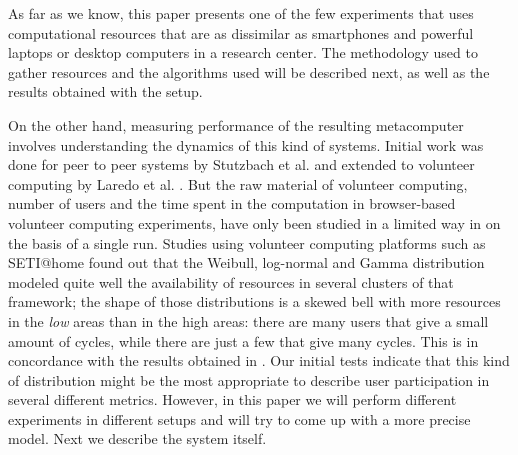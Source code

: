\documentclass[journal,onecolumn]{IEEEtran}
\begin{document}
As far as we know, this paper presents one of the few experiments that
uses computational 
resources that are as dissimilar as smartphones and powerful laptops
or desktop computers in a research center. The methodology used to
gather resources and the algorithms used will be described next, as
well as the results obtained with the setup.




On the other hand, measuring performance of the resulting metacomputer
involves understanding the dynamics of this kind of systems. Initial
work was done for peer to peer systems by Stutzbach et
al. \cite{stutzbach2006understanding} and extended to volunteer
computing by Laredo et al. \cite{churn08,laredo2008rcp}. But the raw material of
volunteer computing, number of users and the time spent in the
computation in browser-based volunteer computing experiments, have only been studied in a limited way in
\cite{DBLP:journals/gpem/LaredoBGVAGF14} on the basis of a single
run. Studies using volunteer computing platforms such as SETI@home
\cite{javadi2009mining} found out that the Weibull, log-normal and Gamma distribution
modeled quite well the availability of resources in several clusters
of that framework; the shape of those distributions is a skewed bell
with more resources in the {\em low} areas than in the high areas:
there are many users that give a small amount of cycles, while there
are just a few that give many cycles. This is in concordance with the
results obtained in \cite{agajaj}. Our initial tests indicate that
this kind of distribution might be the most appropriate to describe
user participation in several different metrics. However, in this
paper we will perform different experiments in different setups and
will try to come up with a more precise model. Next we describe the
system itself. 
\end{document}

